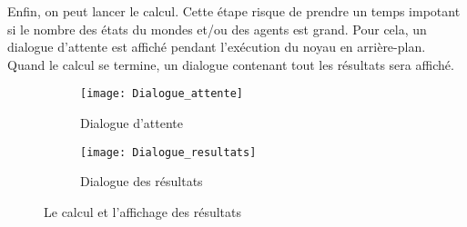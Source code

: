 Enfin, on peut lancer le calcul. Cette étape risque de prendre un temps impotant si le nombre des états
du mondes et/ou des agents est grand. Pour cela, un dialogue d'attente est affiché pendant l'exécution
du noyau en arrière-plan. Quand le calcul se termine, un dialogue contenant tout les résultats sera affiché.

\begin{figure}[H]
\begin{subfigure}{0.39\textwidth}
\texttt{[image: Dialogue\_attente]}
\caption{Dialogue d'attente}
\end{subfigure}
\hfill
\begin{subfigure}{0.59\textwidth}
\texttt{[image: Dialogue\_resultats]}
\caption{Dialogue des résultats}
\end{subfigure}
\caption{Le calcul et l'affichage des résultats}
\end{figure}
